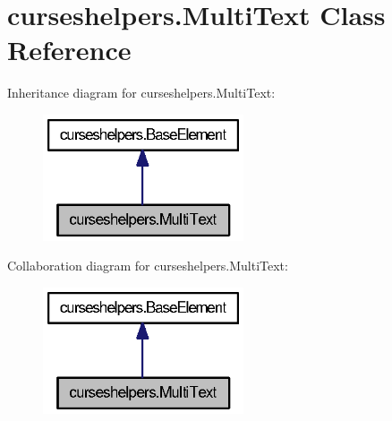 \section{curseshelpers.\-Multi\-Text Class Reference}
\label{classcurseshelpers_1_1MultiText}


Inheritance diagram for curseshelpers.\-Multi\-Text\-:
\nopagebreak
\begin{figure}[H]
\begin{center}
\leavevmode
\includegraphics[width=168pt]{classcurseshelpers_1_1MultiText__inherit__graph}
\end{center}
\end{figure}


Collaboration diagram for curseshelpers.\-Multi\-Text\-:
\nopagebreak
\begin{figure}[H]
\begin{center}
\leavevmode
\includegraphics[width=168pt]{classcurseshelpers_1_1MultiText__coll__graph}
\end{center}
\end{figure}
